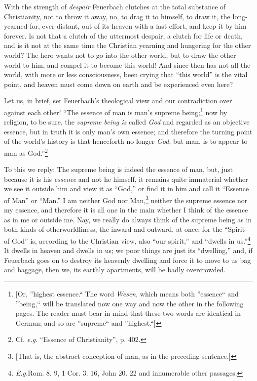 \documentclass[12pt,a4paper]{book}
\begin{document}
With the strength of \textit{despair} Feuerbach clutches at the total 
substance of Christianity, not to throw it away, no, to drag it to himself, to 
draw it, the long-yearned-for, ever-distant, out of its heaven with a last 
effort, and keep it by him forever. Is not that a clutch of the uttermost 
despair, a clutch for life or death, and is it not at the same time the 
Christian yearning and hungering for the other world? The hero wants not to go 
into the other world, but to draw the other world to him, and compel it to 
become this world! And since then has not all the world, with more or less 
consciousness, been crying that ``this world'' is the vital point, and 
heaven must come down on earth and be experienced even here?

Let us, in brief, set Feuerbach's theological view and our contradiction over 
against each other! ``The essence of man is man's supreme 
being;\footnote{[Or, ''highest essence.`` The word \textit{Wesen}, which 
means both ''essence`` and ''being,`` will be translated now one way and 
now the other in the following pages. The reader must bear in mind that these 
two words are identical in German; and so are ''supreme`` and 
''highest.``]} now by religion, to be sure, the \textit{supreme being is} 
called \textit{God} and regarded as an objective essence, but in truth it is 
only man's own essence; and therefore the turning point of the world's history 
is that henceforth no longer \textit{God}, but man, is to appear to man as 
God.''\footnote{Cf. \textit{e.g.} ``Essence of Christianity'', p. 402.}

To this we reply: The supreme being is indeed the essence of man, but, just 
because it is his \textit{essence} and not he himself, it remains quite 
immaterial whether we see it outside him and view it as ``God,'' or find it 
in him and call it ``Essence of Man'' or ``Man.'' I am neither God nor 
Man,\footnote{[That is, the abstract conception of man, as in the preceding 
sentence.]} neither the supreme essence nor my essence, and therefore it is 
all one in the main whether I think of the essence as in me or outside me. 
Nay, we really do always think of the supreme being as in both kinds of 
otherworldliness, the inward and outward, at once; for the ``Spirit of God'' 
is, according to the Christian view, also ``our spirit,'' and ``dwells in 
us.''\footnote{\textit{E.g.}Rom. 8. 9, 1 Cor. 3. 16, John 20. 22 and 
innumerable other passages.} It dwells in heaven and dwells in us; we poor 
things are just its ``dwelling,'' and, if Feuerbach goes on to destroy its 
heavenly dwelling and force it to move to us bag and baggage, then we, its 
earthly apartments, will be badly overcrowded.
\end{document}

